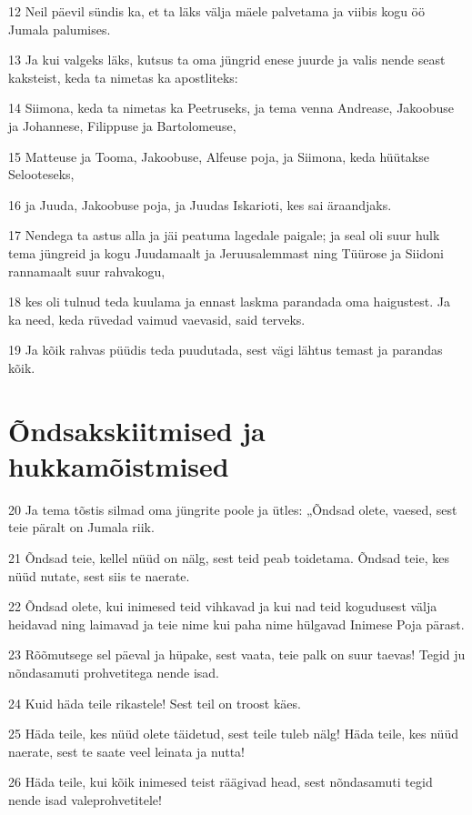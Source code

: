 \par 12 Neil päevil sündis ka, et ta läks välja mäele palvetama ja viibis kogu öö Jumala palumises.
\par 13 Ja kui valgeks läks, kutsus ta oma jüngrid enese juurde ja valis nende seast kaksteist, keda ta nimetas ka apostliteks:
\par 14 Siimona, keda ta nimetas ka Peetruseks, ja tema venna Andrease, Jakoobuse ja Johannese, Filippuse ja Bartolomeuse,
\par 15 Matteuse ja Tooma, Jakoobuse, Alfeuse poja, ja Siimona, keda hüütakse Selooteseks,
\par 16 ja Juuda, Jakoobuse poja, ja Juudas Iskarioti, kes sai äraandjaks.
\par 17 Nendega ta astus alla ja jäi peatuma lagedale paigale; ja seal oli suur hulk tema jüngreid ja kogu Juudamaalt ja Jeruusalemmast ning Tüürose ja Siidoni rannamaalt suur rahvakogu,
\par 18 kes oli tulnud teda kuulama ja ennast laskma parandada oma haigustest. Ja ka need, keda rüvedad vaimud vaevasid, said terveks.
\par 19 Ja kõik rahvas püüdis teda puudutada, sest vägi lähtus temast ja parandas kõik.

\section*{Õndsakskiitmised ja hukkamõistmised}

\par 20 Ja tema tõstis silmad oma jüngrite poole ja ütles: „Õndsad olete, vaesed, sest teie päralt on Jumala riik.
\par 21 Õndsad teie, kellel nüüd on nälg, sest teid peab toidetama. Õndsad teie, kes nüüd nutate, sest siis te naerate.
\par 22 Õndsad olete, kui inimesed teid vihkavad ja kui nad teid kogudusest välja heidavad ning laimavad ja teie nime kui paha nime hülgavad Inimese Poja pärast.
\par 23 Rõõmutsege sel päeval ja hüpake, sest vaata, teie palk on suur taevas! Tegid ju nõndasamuti prohvetitega nende isad.
\par 24 Kuid häda teile rikastele! Sest teil on troost käes.
\par 25 Häda teile, kes nüüd olete täidetud, sest teile tuleb nälg! Häda teile, kes nüüd naerate, sest te saate veel leinata ja nutta!
\par 26 Häda teile, kui kõik inimesed teist räägivad head, sest nõndasamuti tegid nende isad valeprohvetitele!

